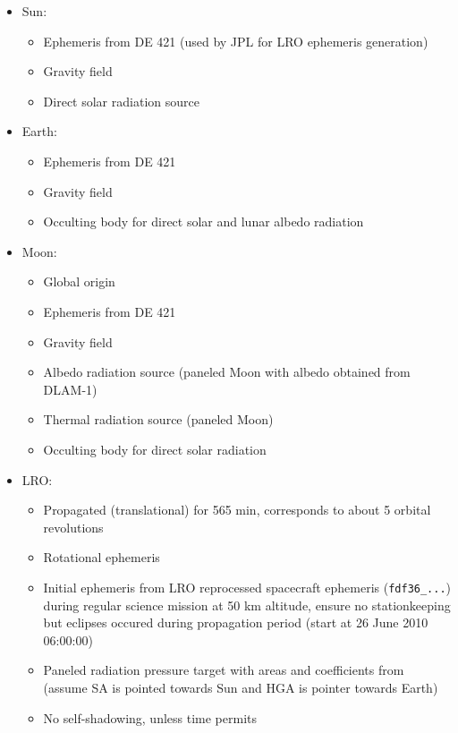 \documentclass[parskip=full,DIV=15]{scrartcl}
\begin{document}
\begin{itemize}
   \item Sun:
   \begin{itemize}
      \item Ephemeris from DE 421 (used by JPL for LRO ephemeris generation)
      \item Gravity field
      \item Direct solar radiation source
   \end{itemize}
   \item Earth:
   \begin{itemize}
      \item Ephemeris from DE 421
      \item Gravity field
      \item Occulting body for direct solar and lunar albedo radiation
   \end{itemize}
   \item Moon:
   \begin{itemize}
      \item Global origin
      \item Ephemeris from DE 421
      \item Gravity field
      \item Albedo radiation source (paneled Moon with albedo obtained from DLAM-1)
      \item Thermal radiation source (paneled Moon)
      \item Occulting body for direct solar radiation
   \end{itemize}
   \item LRO:
   \begin{itemize}
      \item Propagated (translational) for 565 min, corresponds to about 5 orbital revolutions
      \item Rotational ephemeris
      \item Initial ephemeris from LRO reprocessed spacecraft ephemeris (\texttt{fdf36\_...}) during regular science mission at 50 km altitude, ensure no stationkeeping but eclipses occured during propagation period (start at 26 June 2010 06:00:00)
      \item Paneled radiation pressure target with areas and coefficients from \textcite{Smith2008} (assume SA is pointed towards Sun and HGA is pointer towards Earth)
      \item No self-shadowing, unless time permits
   \end{itemize}
\end{itemize}
\end{document}
